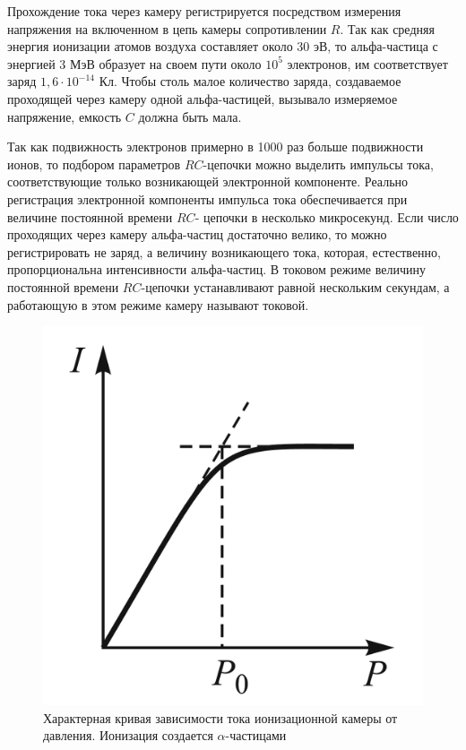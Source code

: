 \documentclass[a4paper, 12pt]{article}%
\begin{document}
	Прохождение тока через камеру регистрируется посредством измерения напряжения на включенном в цепь камеры сопротивлении $ R $.
	Так как средняя энергия ионизации атомов воздуха составляет около 30 эВ, то альфа-частица с энергией 3 МэВ образует на своем пути около $ 10^5 $ электронов, им соответствует заряд $1,6 \cdot 10^{-14} $ Кл. Чтобы
	столь малое количество заряда, создаваемое проходящей через камеру одной альфа-частицей, вызывало измеряемое напряжение, емкость $ C $
	должна быть мала.
	
	Так как подвижность электронов примерно в 1000 раз больше подвижности ионов, то подбором параметров $ RC $-цепочки можно выделить импульсы тока, соответствующие только возникающей электронной компоненте. Реально регистрация электронной компоненты
	импульса тока обеспечивается при величине постоянной времени $ RC $-
	цепочки в несколько микросекунд.
	Если число проходящих через камеру альфа-частиц достаточно велико, то можно регистрировать не заряд, а величину возникающего тока, которая, естественно, пропорциональна интенсивности альфа-частиц. В
	токовом режиме величину постоянной времени $ RC $-цепочки устанавливают равной нескольким секундам, а работающую в этом режиме
	камеру называют токовой.
	
	\begin{figure}
		\includegraphics[width=\linewidth]{images/PotI.png}
		\caption{Характерная кривая зависимости
			тока ионизационной камеры от давления.
			Ионизация создается $ \alpha $-частицами}
		\label{ris PotI}
	\end{figure}
	
\end{document}
